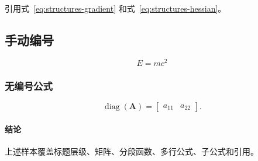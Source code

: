 \documentclass[UTF8]{ctexrep}
\begin{document}
引用式~\eqref{eq:structures-gradient} 和式~\eqref{eq:structures-hessian}。

\subsection{手动编号}

\begin{equation}
E=mc^2
\tag{A.1}
\end{equation}

\subsubsection{无编号公式}

\begin{equation*}
\operatorname{diag}(\bm A)
=
\begin{bmatrix}a_{11}&a_{22}\end{bmatrix}.
\end{equation*}

\paragraph{结论}

上述样本覆盖标题层级、矩阵、分段函数、多行公式、子公式和引用。
\end{document}
